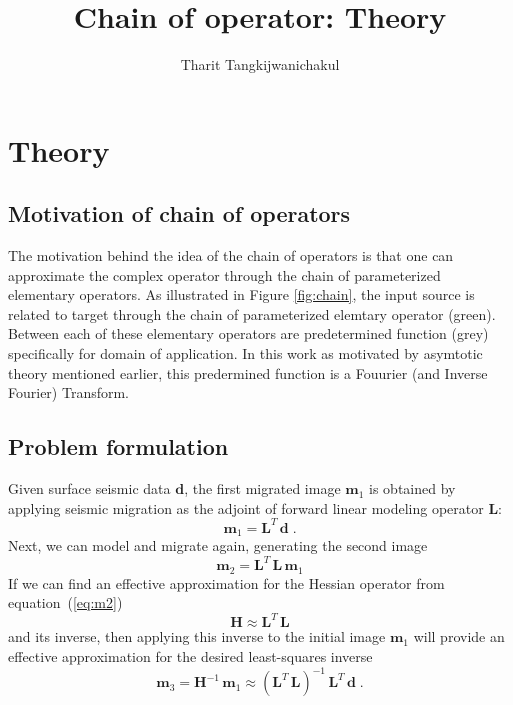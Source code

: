 \title{Chain of operator: Theory}
\author{Tharit Tangkijwanichakul}
\label{ch:chapter-background}
\maketitle
{}

\newcommand\inv[1]{#1\raisebox{1.15ex}{$\scriptscriptstyle-\!1$}} %



\section{Theory}


\subsection{Motivation of chain of operators}


The motivation behind the idea of the chain of operators is that one can approximate the complex operator through the chain of parameterized elementary operators. As illustrated in Figure \ref{fig:chain}, the input source is related to target through the chain of parameterized elemtary operator (green). Between each of these elementary operators are predetermined function (grey) specifically for domain of application. In this work as motivated by asymtotic theory mentioned earlier, this predermined function is a Fouurier (and Inverse Fourier) Transform.

\subsection*{Problem formulation}
Given surface seismic data $\mathbf{d}$, the first migrated image $\mathbf{m}_1$ is obtained by applying seismic migration as the adjoint of forward linear modeling operator $\mathbf{L}$:
\begin{equation}
\label{eq:m1}
    \mathbf{m}_1=\mathbf{L}^{T}\,\mathbf{d}\;.
\end{equation}
Next, we can model and migrate again, generating the second image
\begin{equation}
\label{eq:m2}
    \mathbf{m}_2=\mathbf{L}^{T}\,\mathbf{L\,m}_1
\end{equation}
If we can find an effective approximation for the Hessian operator from equation~(\ref{eq:m2})
\begin{equation}
\label{eq:hessian}
    \mathbf{H} \approx \mathbf{L}^{T}\,\mathbf{L}
\end{equation}
and its inverse, then applying this inverse to the initial image $\mathbf{m}_1$ will provide an effective approximation for the desired least-squares inverse
\begin{equation}
\label{eq:m3}
    \mathbf{m}_3=\mathbf{H}^{-1}\,\mathbf{m}_1 
    \approx \left(\mathbf{L}^{T}\,\mathbf{L}\right)^{-1}\,\mathbf{L}^{T}\,\mathbf{d}\;.
\end{equation}


